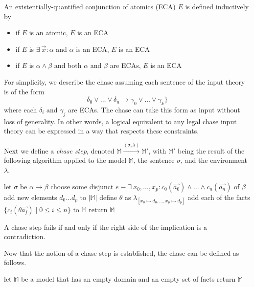 		An existentially-quantified conjunction of atomics (ECA) $E$ is defined
		inductively by
		\begin{itemize}
		\item if $E$ is an atomic, $E$ is an ECA
		\item if $E$ is $\exists\ \vec{x} : \alpha$ and $\alpha$ is an ECA, $E$ is an ECA
		\item if $E$ is $\alpha \wedge \beta$ and both $\alpha$ and $\beta$ are ECAs, $E$ is an ECA
		\end{itemize}
		For simplicity, we describe the chase assuming each sentence of the
		input theory is of the form
			\[
			\delta_0 \vee\ldots\vee \delta_n \to \gamma_0 \vee\ldots\vee \gamma_k\}
			\]
		where each $\delta_i$ and $\gamma_j$ are ECAs. The chase can take this
		form as input without loss of generality. In other words, a logical
		equivalent to any legal chase input theory can be expressed in a way
		that respects these constraints.

		Next we define a \emph{chase step}, denoted $\mathbb{M}
		\xrightarrow{(\sigma,\lambda)} \mathbb{M}'$, with $\mathbb{M'}$ being
		the result of the following algorithm applied to the model
		$\mathbb{M}$, the sentence $\sigma$, and the environment $\lambda$.

		\begin{algorithm}[H]
		\DontPrintSemicolon
		let $\sigma$ be $\alpha \to \beta$ \;
		choose some disjunct $e \equiv \exists\ x_0,\ldots,x_p : c_0(\vec{a_0}) \wedge\ldots\wedge c_n(\vec{a_n})$ of $\beta$ \;
		add new elements $d_0 \ldots d_p$ to $|\mathbb{M}|$ \;
		define $\theta$ as $\lambda_{[x_0 \mapsto d_0 , \ldots , x_p \mapsto d_p]}$ \;
		add each of the facts $\{c_i(\theta\vec{a_j}) \mid 0 \le i \le n \}$ to $\mathbb{M}$ \;
		return $\mathbb{M}$ \;
		\end{algorithm}

		A chase step fails if and only if the right side of the
		implication is a contradiction.

		Now that the notion of a chase step is established, the chase can be
		defined as follows.

		\begin{algorithm}[H]
		\DontPrintSemicolon
		let $\mathbb{M}$ be a model that has an empty domain and an empty set of facts \;
		return $\mathbb{M}$
		\end{algorithm}

